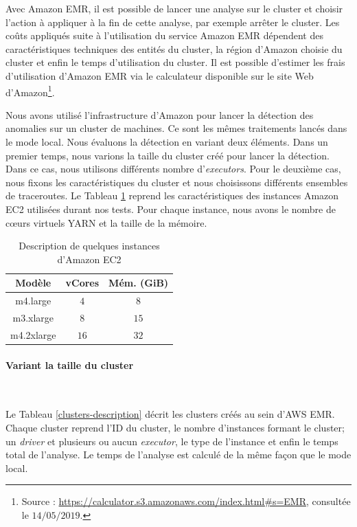 Avec Amazon EMR, il est possible de lancer une analyse sur le cluster et choisir l'action à appliquer à la fin de cette analyse, par exemple arrêter le cluster. Les coûts appliqués suite à l'utilisation du service Amazon EMR dépendent des caractéristiques techniques des entités du cluster, la région d'Amazon choisie du cluster et enfin le temps d'utilisation du cluster. Il est possible d'estimer les frais d'utilisation d'Amazon EMR via le calculateur disponible sur le site Web d'Amazon\footnote{Source : \url{https://calculator.s3.amazonaws.com/index.html\#s=EMR}, consultée le $14/05/2019$.}.

Nous avons utilisé l'infrastructure d'Amazon pour lancer la détection des anomalies sur un cluster de machines. Ce sont les mêmes traitements lancés dans le mode local. Nous évaluons la détection en variant deux éléments. Dans un premier temps, nous varions la taille du cluster créé pour lancer la détection. Dans ce cas, nous utilisons différents nombre d'\textit{executors}. Pour le deuxième cas, nous fixons les caractéristiques du cluster et  nous choisissons différents ensembles de traceroutes. 
Le Tableau \ref{instances-types-description} reprend les caractéristiques des instances Amazon EC2 utilisées durant nos tests. Pour chaque instance, nous avons le nombre de c\oe{}urs virtuels YARN et la taille de la mémoire.
\begin{table}[H]
	\centering
\begin{tabular}{|c|c|c|}
	\hline 
\textbf{Modèle} &	\textbf{vCores} &\textbf{	Mém. (GiB)} \\ 
	\hline 
m4.large&	$ 4 $&	$ 8 $ \\
	\hline 
m3.xlarge&	$ 8 $&	$ 15 $\\
\hline 
m4.2xlarge&	$ 16 $&	$ 32 $ \\ 
	\hline 
\end{tabular}
\caption{Description de quelques instances d'Amazon EC2}
\label{instances-types-description}
\end{table} 
\paragraph{Variant la taille du cluster}~


Le Tableau \ref{clusters-description} décrit les clusters créés au sein d'AWS EMR.  Chaque cluster reprend l'ID du cluster, le nombre d'instances formant le cluster; un \textit{driver} et  plusieurs ou aucun \textit{executor}, le type de l'instance et enfin le temps total de l'analyse. Le temps de l'analyse est calculé de la même façon  que le mode local. 



